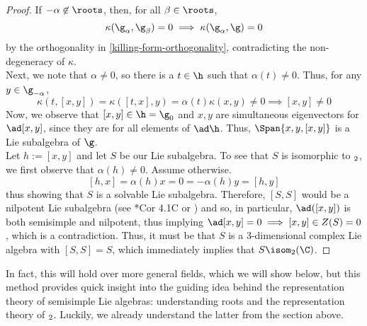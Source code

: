 \documentclass[11pt,leqno,oneside]{amsart}
\numberwithin{thm}{section}
\begin{document}
\begin{proof}
  If \(-\alpha \not\in \roots\), then, for all \(\beta \in
  \roots\), \[
    \kappa(\g_\alpha, \g_\beta) = 0 \implies \kappa(\g_\alpha, \g) = 0
  \]
  by the orthogonality in \ref{killing-form-orthogonality},
  contradicting the non-degeneracy of \(\kappa\). \\

  Next, we note that \(\alpha \neq 0\), so there is a \(t \in \h\)
  such that \(\alpha(t) \neq 0\). Thus, for any \(y \in \g_{-\alpha}\), \[
    \kappa(t,[x,y]) = \kappa([t,x],y) = \alpha(t)\kappa(x,y) \neq 0
    \implies [x,y] \neq 0
  \]
  Now, we observe that \([x,y] \in \h = \g_0\) and \(x,y\) are
  simultaneous eigenvectors for \(\ad[x,y]\), since they are for all
  elements of \(\ad \h\). Thus, \(\Span\{x,y,[x,y]\}\) is a Lie
  subalgebra of \(\g\). \\

  Let \(h := [x,y]\) and let \(S\) be our Lie subalgebra. To see that
  \(S\) is isomorphic to
  \(\sl_2\), we first 
  observe that \(\alpha(h) \neq 0\). Assume otherwise. \[
    [h,x] = \alpha(h)x = 0 = -\alpha(h)y = [h,y]
  \]
  thus showing that \(S\) is a solvable Lie subalgebra. Therefore,
  \([S,S]\) would be a nilpotent Lie subalgebra (see \cite{humph}*{Cor 4.1C}
  or \cite{nilp-las}) and so, in particular, \(\ad([x,y])\) is both
  semisimple and nilpotent, thus implying \(\ad[x,y]=0 \implies [x,y]
  \in Z(S) = 0\), which is a contradiction. Thus, it must be that
  \(S\) is a \(3\)-dimensional complex Lie algebra with \([S,S] = S\),
  which immediately implies that \(S \isom \sl_2(\C)\).
\end{proof}
In fact, this will hold over more general fields, which we will show
below, but this method provides quick insight into the guiding idea
behind the representation theory of semisimple Lie algebras:
understanding roots and the representation theory of
\(\sl_2\). Luckily, we already understand the latter from the section
above. \\
\end{document}
